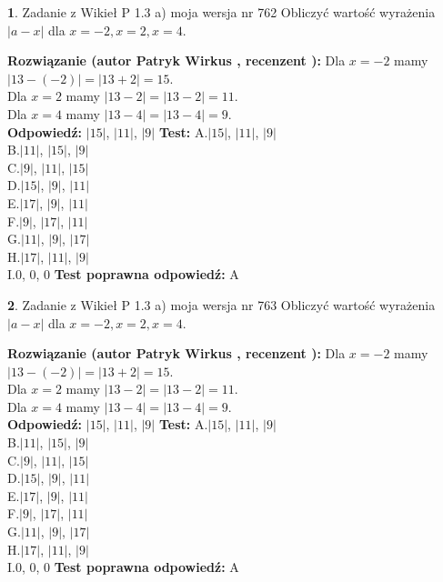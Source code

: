 \documentclass[12pt, a4paper]{article}
\theoremstyle{definition} %
\newtheorem{zad}{}
\newcommand{\zadStart}[1]{\begin{zad}#1\newline}
\newcommand{\zadStop}{\end{zad}}
\newcommand{\rozwStart}[2]{\noindent \textbf{Rozwiązanie (autor #1 , recenzent #2): }\newline}
\newcommand{\rozwStop}{\newline}
\newcommand{\odpStart}{\noindent \textbf{Odpowiedź:}\newline}
\newcommand{\odpStop}{\newline}
\newcommand{\testStart}{\noindent \textbf{Test:}\newline}
\newcommand{\testStop}{\newline}
\newcommand{\kluczStart}{\noindent \textbf{Test poprawna odpowiedź:}\newline}
\newcommand{\kluczStop}{\newline}
\begin{document}
\zadStart{Zadanie z Wikieł P 1.3 a) moja wersja nr 762}
Obliczyć wartość wyrażenia $|a - x|$ dla $x=-2,x=2,x=4$.
\zadStop
\rozwStart{Patryk Wirkus}{}
Dla $x = -2$ mamy $|13 - (-2)| = |13 + 2| = 15$.\\
Dla $x = 2$ mamy $|13 - 2| = |13 - 2| = 11$.\\
Dla $x = 4$ mamy $|13 - 4| = |13 - 4| = 9$.\\
\rozwStop
\odpStart
$|15|$, $|11|$, $|9|$
\odpStop
\testStart
A.$|15|$, $|11|$, $|9|$\\
B.$|11|$, $|15|$, $|9|$\\
C.$|9|$, $|11|$, $|15|$\\
D.$|15|$, $|9|$, $|11|$\\
E.$|17|$, $|9|$, $|11|$\\
F.$|9|$, $|17|$, $|11|$\\
G.$|11|$, $|9|$, $|17|$\\
H.$|17|$, $|11|$, $|9|$\\
I.$0$, $0$, $0$
\testStop
\kluczStart
A
\kluczStop



\zadStart{Zadanie z Wikieł P 1.3 a) moja wersja nr 763}
Obliczyć wartość wyrażenia $|a - x|$ dla $x=-2,x=2,x=4$.
\zadStop
\rozwStart{Patryk Wirkus}{}
Dla $x = -2$ mamy $|13 - (-2)| = |13 + 2| = 15$.\\
Dla $x = 2$ mamy $|13 - 2| = |13 - 2| = 11$.\\
Dla $x = 4$ mamy $|13 - 4| = |13 - 4| = 9$.\\
\rozwStop
\odpStart
$|15|$, $|11|$, $|9|$
\odpStop
\testStart
A.$|15|$, $|11|$, $|9|$\\
B.$|11|$, $|15|$, $|9|$\\
C.$|9|$, $|11|$, $|15|$\\
D.$|15|$, $|9|$, $|11|$\\
E.$|17|$, $|9|$, $|11|$\\
F.$|9|$, $|17|$, $|11|$\\
G.$|11|$, $|9|$, $|17|$\\
H.$|17|$, $|11|$, $|9|$\\
I.$0$, $0$, $0$
\testStop
\kluczStart
A
\kluczStop
\end{document}
